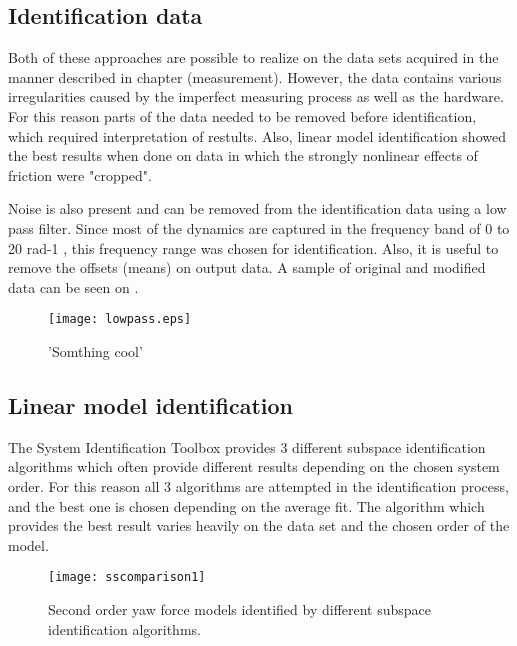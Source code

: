 
\subsection{Identification data}
Both of these approaches are possible to realize on the data sets acquired in the manner described in chapter (measurement).
However, the data contains various irregularities caused by the imperfect measuring process as well as the hardware.
For this reason parts of the data needed to be removed before identification, which required interpretation of restults.
Also, linear model identification showed the best results when done on data in which the strongly nonlinear effects of friction were "cropped".


Noise is also present and can be removed from the identification data using a low pass filter.
Since most of the dynamics are captured in the frequency band of 0 to 20 rad-1 , this frequency range was chosen for identification.
Also, it is useful to remove the offsets (means) on output data.
A sample of original and modified data can be seen on .
%
\begin{figure}[H]
\centering
\texttt{[image: lowpass.eps]}
\caption{'Somthing cool'}
\label{figlowpass}
\end{figure}

\subsection{Linear model identification}

The System Identification Toolbox provides 3 different subspace identification algorithms which often provide different results depending on the chosen system order. 
For this reason all 3 algorithms are attempted in the identification process, and the best one is chosen depending on the average fit.
The algorithm which provides the best result varies heavily on the data set and the chosen order of the model.

\begin{figure}[H]
\centering
\hspace{-2em}\texttt{[image: sscomparison1]}
\caption{Second order yaw force models identified by different subspace identification algorithms.}
\label{fig:1LMI}
\end{figure}


